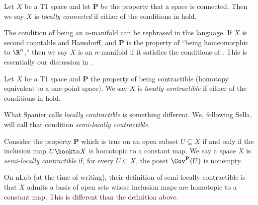 \documentclass[11pt]{amsart}
\begin{document}
\begin{definition}\label{def:locally-connected} Let $X$ be a T1 space and let \textbf{P} be the property that a space is connected. Then we say $X$ is \emph{locally connected} if either of the conditions in  hold.
\end{definition}

\begin{remark} The condition of being an $n$-manifold can be rephrased in this language. If $X$ is second countable and Hausdorff, and \textbf{P} is the property of ``being homeomorphic to $\R^n$,'' then we say $X$ is an $n$-manifold if it satisfies the conditions of . This is essentially our discussion in .
\end{remark}

\begin{definition}\label{def:locally-contractible} Let $X$ be a T1 space and \textbf{P} the property of being contractible (homotopy equivalent to a one-point space). We say $X$ is \emph{locally contractible} if either of the conditions in  hold.
\end{definition}

What Spanier calls \emph{locally contractible} is something different. We, following Sella, will call that condition \emph{semi-locally contractible}.

\begin{definition}\label{def:semi-locally-contractible} Consider the property \textbf{P} which is true on an open subset $U \subseteq X$ if and only if the inclusion map $U \hookto X$ is homotopic to a constant map. We say a space $X$ is \emph{semi-locally contractible} if, for every $U \subseteq X$, the poset $\Cov^{\mathbf{P}}(U)$ is nonempty.
\end{definition}

\begin{remark} On nLab (at the time of writing), their definition of semi-locally contractible is that $X$ admits a basis of open sets whose inclusion maps are homotopic to a constant map. This is different than the definition above.
\end{remark}
\end{document}
